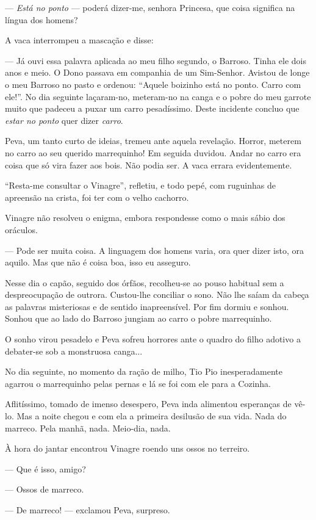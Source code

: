 --- \emph{Está no ponto} --- poderá dizer-me, senhora Princesa, que
coisa significa na língua dos homens?

A vaca interrompeu a mascação e disse:

--- Já ouvi essa palavra aplicada ao meu filho segundo, o Barroso. Tinha
ele dois anos e meio. O Dono passava em companhia de um Sim-Senhor.
Avistou de longe o meu Barroso no pasto e ordenou: ``Aquele boizinho
está no ponto. Carro com ele!''. No dia seguinte laçaram-no, meteram-no
na canga e o pobre do meu garrote muito que padeceu a puxar um carro
pesadíssimo. Deste incidente concluo que \emph{estar no ponto} quer
dizer \emph{carro}.

Peva, um tanto curto de ideias, tremeu ante aquela revelação. Horror,
meterem no carro ao seu querido marrequinho! Em seguida duvidou. Andar
no carro era coisa que só vira fazer aos bois. Não podia ser. A vaca
errara evidentemente.

``Resta-me consultar o Vinagre'', refletiu, e todo pepé, com ruguinhas
de apreensão na crista, foi ter com o velho cachorro.

Vinagre não resolveu o enigma, embora respondesse como o mais sábio dos
oráculos.

--- Pode ser muita coisa. A linguagem dos homens varia, ora quer dizer
isto, ora aquilo. Mas que não é coisa boa, isso eu asseguro.

Nesse dia o capão, seguido dos órfãos, recolheu-se ao pouso habitual sem
a despreocupação de outrora. Custou-lhe conciliar o sono. Não lhe saíam
da cabeça as palavras misteriosas e de sentido inapreensível. Por fim
dormiu e sonhou. Sonhou que ao lado do Barroso jungiam ao carro o pobre
marrequinho.

O sonho virou pesadelo e Peva sofreu horrores ante o quadro do filho
adotivo a debater-se sob a monstruosa canga...

No dia seguinte, no momento da ração de milho, Tio Pio inesperadamente
agarrou o marrequinho pelas pernas e lá se foi com ele para a Cozinha.

Aflitíssimo, tomado de imenso desespero, Peva inda alimentou esperanças
de vê-lo. Mas a noite chegou e com ela a primeira desilusão de sua vida.
Nada do marreco. Pela manhã, nada. Meio-dia, nada.

À hora do jantar encontrou Vinagre roendo uns ossos no terreiro.

--- Que é isso, amigo?

--- Ossos de marreco.

--- De marreco! --- exclamou Peva, surpreso.

